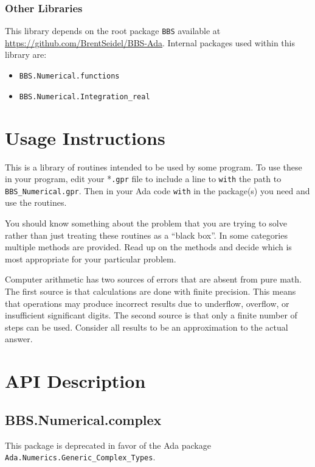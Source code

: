\documentclass[10pt, openany]{book}
\newcommand{\package}[1]{\texttt{#1}}
\newcommand{\keyword}[1]{\texttt{#1}}
\begin{document}
\subsection{Other Libraries}
This library depends on the root package \package{BBS} available at \url{https://github.com/BrentSeidel/BBS-Ada}.
Internal packages used within this library are:
\begin{itemize}
  \item \package{BBS.Numerical.functions}
  \item \package{BBS.Numerical.Integration\_real}
\end{itemize}

\chapter{Usage Instructions}
This is a library of routines intended to be used by some program.  To use these in your program, edit your *\keyword{.gpr} file to include a line to \keyword{with} the path to \keyword{BBS\_Numerical.gpr}.  Then in your Ada code \keyword{with} in the package(s) you need and use the routines.

You should know something about the problem that you are trying to solve rather than just treating these routines as a ``black box''.  In some categories multiple methods are provided.  Read up on the methods and decide which is most appropriate for your particular problem.

Computer arithmetic has two sources of errors that are absent from pure math.  The first source is that calculations are done with finite precision.  This means that operations may produce incorrect results due to underflow, overflow, or insufficient significant digits.  The second source is that only a finite number of steps can be used.  Consider all results to be an approximation to the actual answer.

\chapter{API Description}
\section{BBS.Numerical.complex}
This package is deprecated in favor of the Ada package \package{Ada.Numerics.Generic\_Complex\_Types}.
\end{document}
